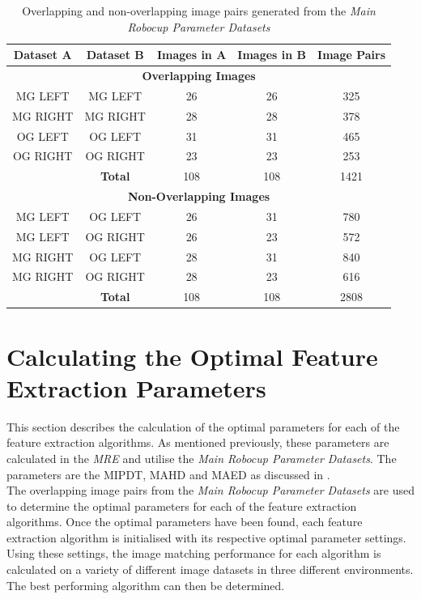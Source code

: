 \documentclass{report}
\begin{document}
\begin{table}
\caption{Overlapping and non-overlapping image pairs generated from the \textit{Main Robocup Parameter Datasets} }
\begin{tabular}{|c|c|c|c|c|}
\hline 
\textbf{Dataset A} & \textbf{Dataset B} & \textbf{Images in A} & \textbf{Images in B} & \textbf{Image Pairs}\tabularnewline
\hline 
\hline 
\multicolumn{5}{|c}{\textbf{Overlapping Images}}\tabularnewline
\hline 
MG LEFT & MG LEFT & 26 & 26 & 325\tabularnewline
\hline 
MG RIGHT & MG RIGHT & 28 & 28 & 378\tabularnewline
\hline 
OG LEFT & OG LEFT & 31 & 31 & 465\tabularnewline
\hline 
OG RIGHT & OG RIGHT & 23 & 23 & 253\tabularnewline
\hline 
 & \textbf{Total} & 108 & 108 & 1421\tabularnewline
\hline 
\multicolumn{5}{|c}{\textbf{Non-Overlapping Images}}\tabularnewline
\hline 
MG LEFT & OG LEFT & 26 & 31 & 780\tabularnewline
\hline 
MG LEFT & OG RIGHT & 26 & 23 & 572\tabularnewline
\hline 
MG RIGHT & OG LEFT & 28 & 31 & 840\tabularnewline
\hline 
MG RIGHT & OG RIGHT & 28 & 23 & 616\tabularnewline
\hline 
 & \textbf{Total} & 108 & 108 & 2808\tabularnewline
\hline 
\end{tabular}
\label{tab:mrpd}
\end{table}

\section{Calculating the Optimal Feature Extraction Parameters}
\label{sec:optimalParameters}
This section describes the calculation of the optimal parameters for each of the feature extraction algorithms. As mentioned previously, these parameters are calculated in the \textit{MRE} and utilise the \textit{Main Robocup Parameter Datasets}. The parameters are the MIPDT, MAHD and MAED as discussed in .\\

The overlapping image pairs from the \textit{Main Robocup Parameter Datasets} are used to determine the optimal parameters for each of the feature extraction algorithms. Once the optimal parameters have been found, each feature extraction algorithm is initialised with its respective optimal parameter settings. Using these settings, the image matching performance for each algorithm is calculated on a variety of different image datasets in three different environments. The best performing algorithm can then be determined.\\
\end{document}
